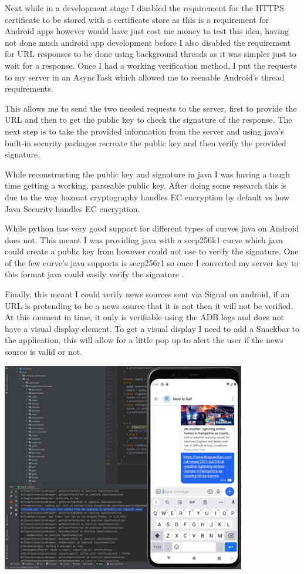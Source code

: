 \documentclass[a4paper, 11pt]{article}
\begin{document}
Next while in a development stage I disabled the requirement for the HTTPS certificate to be stored with a certificate store as this is a requirement for Android apps however would have just cost me money to test this idea, having not done much android app development before I also disabled the requirement for URL responses to be done using background threads as it was simpler just to wait for a response. Once I had a working verification method, I put the requests to my server in an AsyncTask which allowed me to reenable Android’s thread requirements. 

This allows me to send the two needed requests to the server, first to provide the URL and then to get the public key to check the signature of the response. The next step is to take the provided information from the server and using java’s built-in security packages recreate the public key and then verify the provided signature.

While reconstructing the public key and signature in java I was having a tough time getting a working, parseable public key. After doing some research this is due to the way hazmat cryptography handles EC encryption by default vs how Java Security handles EC encryption.

While python has very good support for different types of curves java on Android does not. This meant I was providing java with a secp256k1 curve which java could create a public key from however could not use to verify the signature. One of the few curve’s java supports is secp256r1 so once I converted my server key to this format java could easily verify the signature \cite{Exception}.

Finally, this meant I could verify news sources sent via Signal on android, if an URL is pretending to be a news source that it is not then it will not be verified. At this moment in time, it only is verifiable using the ADB logs and does not have a visual display element. To get a visual display I need to add a Snackbar to the application, this will allow for a little pop up to alert the user if the news source is valid or not.
\begin{center}
\includegraphics[width=0.8\textwidth]{image/phone.png}
\end{center}
\newpage
\end{document}

